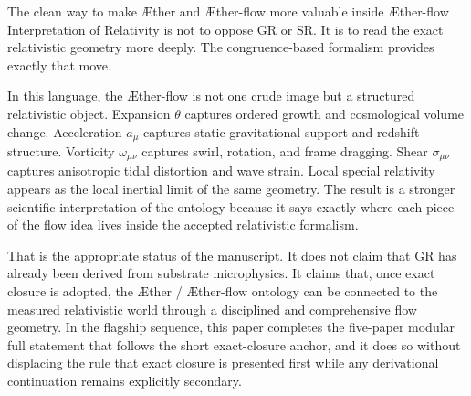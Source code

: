 \documentclass[11pt]{article}
\newcommand{\Aether}{\AE{}ther}
\newcommand{\Aflow}{\AE{}ther-flow}
\newcommand{\TheoryName}{\Aflow{} Interpretation of Relativity}
\begin{document}
The clean way to make \Aether{} and \Aflow{} more valuable inside \TheoryName{} is not to oppose GR or SR. It is to read the exact relativistic geometry more deeply. The congruence-based formalism provides exactly that move.

In this language, the \Aflow{} is not one crude image but a structured relativistic object. Expansion \(\theta\) captures ordered growth and cosmological volume change. Acceleration \(a_\mu\) captures static gravitational support and redshift structure. Vorticity \(\omega_{\mu\nu}\) captures swirl, rotation, and frame dragging. Shear \(\sigma_{\mu\nu}\) captures anisotropic tidal distortion and wave strain. Local special relativity appears as the local inertial limit of the same geometry. The result is a stronger scientific interpretation of the ontology because it says exactly where each piece of the flow idea lives inside the accepted relativistic formalism.

That is the appropriate status of the manuscript. It does not claim that GR has already been derived from substrate microphysics. It claims that, once exact closure is adopted, the \Aether{} / \Aflow{} ontology can be connected to the measured relativistic world through a disciplined and comprehensive flow geometry. In the flagship sequence, this paper completes the five-paper modular full statement that follows the short exact-closure anchor, and it does so without displacing the rule that exact closure is presented first while any derivational continuation remains explicitly secondary.


\end{document}
